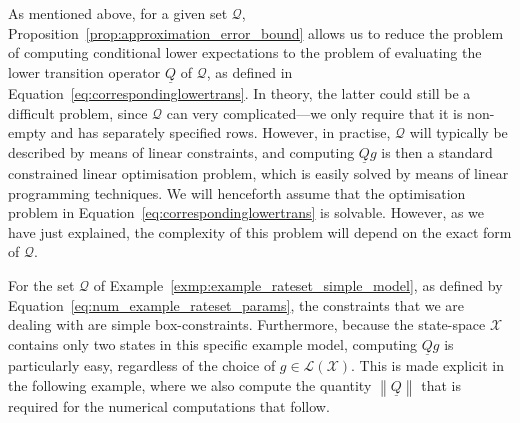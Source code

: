 \documentclass[10pt,a4paper]{paper}
\theoremstyle{definition}
\newcommand{\states}{\mathcal{X}}
\newcommand{\gambles}{\mathcal{L}}
\newcommand{\gamblesX}{\gambles(\states)}
\newcommand{\rateset}{\mathcal{Q}}
\newcommand{\lrate}{\underline{Q}}
\newcommand{\norm}[1]{\left\lVert #1 \right\rVert}
\newcommand{\coloneqq}{:\!=}
\begin{document}
As mentioned above, for a given set $\rateset$, Proposition~\ref{prop:approximation_error_bound} allows us to reduce the problem of computing conditional lower expectations to the problem of evaluating the lower transition operator $\lrate$ of $\rateset$, as defined in Equation~\eqref{eq:correspondinglowertrans}. In theory, the latter could still be a difficult problem, since $\rateset$ can very complicated---we only require that it is non-empty and has separately specified rows. However, in practise, $\rateset$ will typically be described by means of linear constraints, and computing $\lrate g$ is then a standard constrained linear optimisation problem, which is easily solved by means of linear programming techniques. 
We will henceforth assume that the optimisation problem in Equation~\eqref{eq:correspondinglowertrans} is solvable. However, as we have just explained, the complexity of this problem will depend on the exact form of $\rateset$.

For the set $\rateset$ of Example~\ref{exmp:example_rateset_simple_model}, as defined by Equation~\eqref{eq:num_example_rateset_params}, the constraints that we are dealing with are simple box-constraints. Furthermore, because the state-space $\states$ contains only two states in this specific example model, computing $\lrate g$ is particularly easy, regardless of the choice of $g\in\gamblesX$. This is made explicit in the following example, where we also compute the quantity $\norm{\lrate}$ that is required for the numerical computations that follow.
\end{document}
